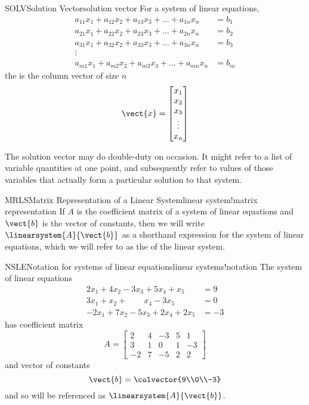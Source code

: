 \begin{definition}{SOLV}{Solution Vector}{solution vector}
For a system of linear equations,
\begin{align*}
a_{11}x_1+a_{12}x_2+a_{13}x_3+\dots+a_{1n}x_n&=b_1\\
a_{21}x_1+a_{22}x_2+a_{23}x_3+\dots+a_{2n}x_n&=b_2\\
a_{31}x_1+a_{32}x_2+a_{33}x_3+\dots+a_{3n}x_n&=b_3\\
\vdots&\\
a_{m1}x_1+a_{m2}x_2+a_{m3}x_3+\dots+a_{mn}x_n&=b_m
\end{align*}
the  is the column vector of size $n$
\begin{equation*}
\vect{x}=
\begin{bmatrix}
x_1\\
x_2\\
x_3\\
\vdots\\
x_n\\
\end{bmatrix}
\end{equation*}
\end{definition}
%
The solution vector may do double-duty on occasion.  It might refer to a list of variable quantities at one point, and subsequently refer to values of those variables that actually form a particular solution to that system.
%
\begin{definition}{MRLS}{Matrix Representation of a Linear System}{linear system!matrix representation}
If $A$ is the coefficient matrix of a system of linear equations and $\vect{b}$ is the vector of constants, then we will write $\linearsystem{A}{\vect{b}}$ as a shorthand expression for the  system of linear equations, which we will refer to as the  of the linear system.
\end{definition}
%
\begin{example}{NSLE}{Notation for systems of linear equations}{linear systems!notation}
The system of linear equations
%
\begin{align*}
2x_1+4x_2-3x_3+5x_4+x_5&=9\\
3x_1+x_2+\quad\quad x_4-3x_5&=0\\
-2x_1+7x_2-5x_3+2x_4+2x_5&=-3
\end{align*}
%
has coefficient matrix
%
\begin{equation*}
A=
\begin{bmatrix}
2 & 4 & -3 & 5 & 1\\
3 & 1 & 0 & 1 & -3\\
-2 & 7 & -5 & 2 & 2
\end{bmatrix}
\end{equation*}
%
and vector of constants
%
\begin{equation*}
\vect{b}=\colvector{9\\0\\-3}
\end{equation*}
%
and so will be referenced as $\linearsystem{A}{\vect{b}}$.
%
\end{example}
